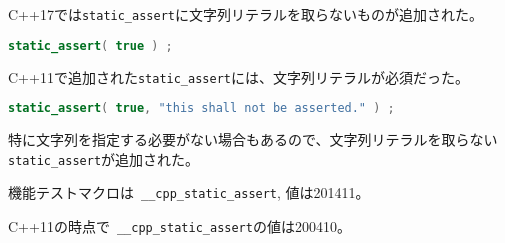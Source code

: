 %

C++17では\lstinline!static_assert!に文字列リテラルを取らないものが追加された。

\begin{lstlisting}[language=C++]
static_assert( true ) ;
\end{lstlisting}

C++11で追加された\lstinline!static_assert!には、文字列リテラルが必須だった。

\begin{lstlisting}[language=C++]
static_assert( true, "this shall not be asserted." ) ;
\end{lstlisting}

特に文字列を指定する必要がない場合もあるので、文字列リテラルを取らない\lstinline!static_assert!が追加された。

機能テストマクロは~\lstinline!__cpp_static_assert!, 値は201411。

C++11の時点で~\lstinline!__cpp_static_assert!の値は200410。
